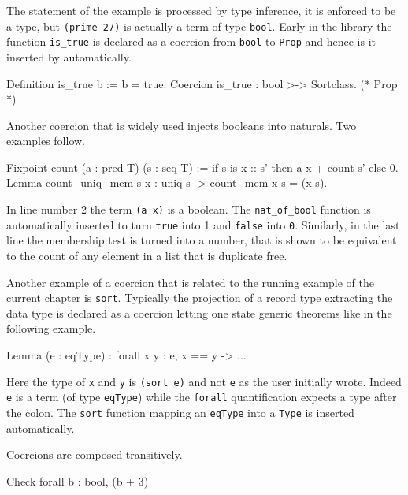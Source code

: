 The statement of the example is processed by type inference,
it is enforced to be a type, but \lstinline/(prime 27)/ is actually
a term of type \lstinline/bool/.  Early in the library the
function \lstinline/is_true/ is declared as a coercion from
\lstinline/bool/ to \lstinline/Prop/ and hence is it inserted
by \Coq{} automatically.

\begin{coq}{}
Definition is_true b := b = true.
Coercion is_true : bool >-> Sortclass. (* Prop *)
\end{coq}

Another coercion that is widely used injects booleans into naturals.
Two examples follow.

\begin{coq}{}
Fixpoint count (a : pred T) (s : seq T) :=
  if s is x :: s' then a x + count s' else 0.
Lemma count_uniq_mem s x : uniq s -> count_mem x s = (x \in s).
\end{coq}

In line number 2 the term \lstinline/(a x)/ is a boolean.  The
\lstinline/nat_of_bool/ function is automatically inserted to turn
\lstinline/true/ into 1 and \lstinline/false/ into \lstinline/0/.
Similarly, in the last line the membership test is turned into
a number, that is shown to be equivalent to the count of any
element in a list that is duplicate free.

Another example of a coercion that is related to the running example
of the current chapter is \lstinline/sort/.  Typically the projection
of a record type extracting the data type is declared as a coercion
letting one state generic theorems like in the following example.

\begin{coq}{}
Lemma  (e : eqType) : forall x y : e, x == y -> ...
\end{coq}

Here the type of \lstinline/x/ and \lstinline/y/ is
\lstinline/(sort e)/ and not \lstinline/e/ as the user initially wrote.
Indeed \lstinline/e/ is a term (of type \lstinline/eqType/) while
the \lstinline/forall/ quantification expects a type after the
colon.  The \lstinline/sort/ function mapping an \lstinline/eqType/
into a \lstinline/Type/ is inserted automatically.

Coercions are composed transitively.

\begin{coq}{}
Check forall b : bool, (b + 3)%
\end{coq}

